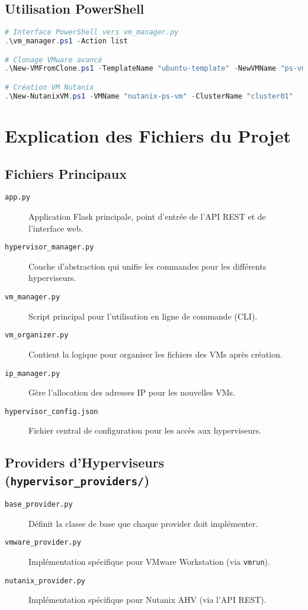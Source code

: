 \documentclass[11pt,a4paper]{article}
\begin{document}
\subsection{Utilisation PowerShell}
\begin{lstlisting}[language=powershell]
# Interface PowerShell vers vm_manager.py
.\vm_manager.ps1 -Action list

# Clonage VMware avancé
.\New-VMFromClone.ps1 -TemplateName "ubuntu-template" -NewVMName "ps-vm-test"

# Création VM Nutanix
.\New-NutanixVM.ps1 -VMName "nutanix-ps-vm" -ClusterName "cluster01"
\end{lstlisting}

\section{Explication des Fichiers du Projet}

\subsection{Fichiers Principaux}
\begin{description}
    \item[\texttt{app.py}] Application Flask principale, point d'entrée de l'API REST et de l'interface web.
    \item[\texttt{hypervisor\_manager.py}] Couche d'abstraction qui unifie les commandes pour les différents hyperviseurs.
    \item[\texttt{vm\_manager.py}] Script principal pour l'utilisation en ligne de commande (CLI).
    \item[\texttt{vm\_organizer.py}] Contient la logique pour organiser les fichiers des VMs après création.
    \item[\texttt{ip\_manager.py}] Gère l'allocation des adresses IP pour les nouvelles VMs.
    \item[\texttt{hypervisor\_config.json}] Fichier central de configuration pour les accès aux hyperviseurs.
\end{description}

\subsection{Providers d'Hyperviseurs (\texttt{hypervisor\_providers/})}
\begin{description}
    \item[\texttt{base\_provider.py}] Définit la classe de base que chaque provider doit implémenter.
    \item[\texttt{vmware\_provider.py}] Implémentation spécifique pour VMware Workstation (via \texttt{vmrun}).
    \item[\texttt{nutanix\_provider.py}] Implémentation spécifique pour Nutanix AHV (via l'API REST).
\end{description}
\end{document}
